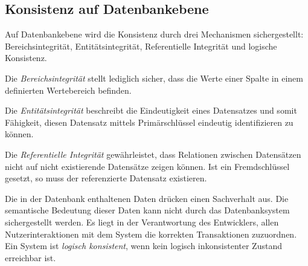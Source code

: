 \subsection{Konsistenz auf Datenbankebene}

Auf Datenbankebene wird die Konsistenz durch drei Mechanismen sichergestellt: Bereichsintegrität, Entitätsintegrität, Referentielle Integrität und logische Konsistenz.

Die \textit{Bereichsintegrität} stellt lediglich sicher, dass die Werte einer Spalte in einem definierten Wertebereich befinden. 

Die \textit{Entitätsintegrität} beschreibt die Eindeutigkeit eines Datensatzes und somit Fähigkeit, diesen Datensatz mittels Primärschlüssel eindeutig identifizieren zu können.

Die \textit{Referentielle Integrität} gewährleistet, dass Relationen zwischen Datensätzen nicht auf nicht existierende Datensätze zeigen können. Ist ein Fremdschlüssel gesetzt, so muss der referenzierte Datensatz existieren. 

Die in der Datenbank enthaltenen Daten drücken einen Sachverhalt aus. Die semantische Bedeutung dieser Daten kann nicht durch das Datenbanksystem sichergestellt werden. Es liegt in der Verantwortung des Entwicklers, allen Nutzerinteraktionen mit dem System die korrekten Transaktionen zuzuordnen. Ein System ist \textit{logisch konsistent}, wenn kein logisch inkonsistenter Zustand erreichbar ist. 